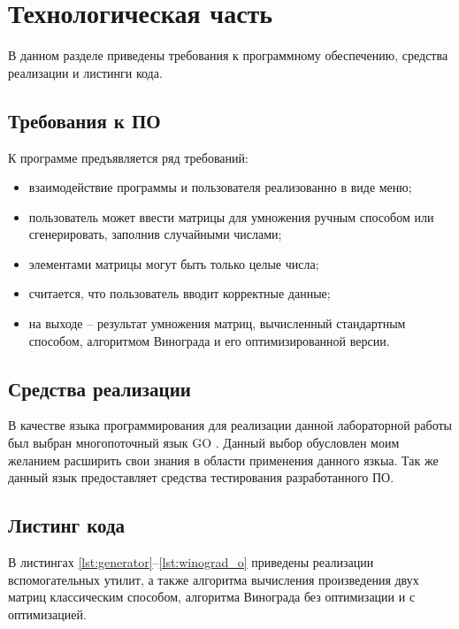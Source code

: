 \chapter{Технологическая часть}

В данном разделе приведены требования к программному обеспечению, средства реализации и листинги кода.

\section{Требования к ПО}

К программе предъявляется ряд требований:
\begin{itemize}
	\item взаимодействие программы и пользователя реализованно в виде меню;
	\item пользователь может ввести матрицы для умножения ручным способом или сгенерировать, заполнив случайными числами;
	\item элементами матрицы могут быть только целые числа;
	\item считается, что пользователь вводит корректные данные;
	\item на выходе -- результат умножения матриц, вычисленный стандартным способом, алгоритмом Винограда и его оптимизированной версии.
\end{itemize}

\section{Средства реализации}

В качестве языка программирования для реализации данной лабораторной работы был выбран многопоточный язык GO \cite{golang}. Данный выбор обусловлен моим желанием расширить свои знания в области применения данного язкыа. Так же данный язык предоставляет средства тестирования разработанного ПО.

\section{Листинг кода}

В листингах \ref{lst:generator}--\ref{lst:winograd_o} приведены реализации вспомогательных утилит, а также алгоритма вычисления произведения двух матриц классическим способом, алгоритма Винограда без оптимизации и с оптимизацией.

\clearpage

\captionsetup{singlelinecheck = false, justification=raggedright}

